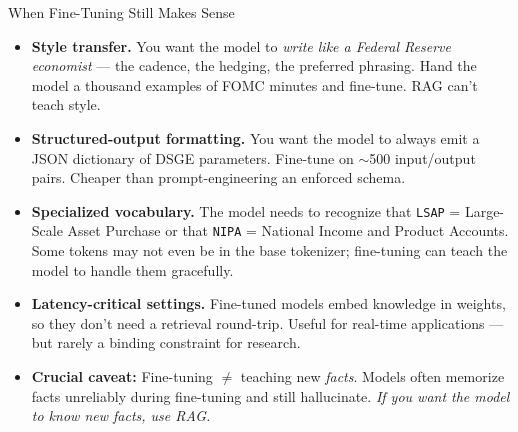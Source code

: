 \begin{frame}{When Fine-Tuning Still Makes Sense}
\begin{itemize}
\item \textbf{Style transfer.} You want the model to \emph{write like a Federal Reserve economist} --- the cadence, the hedging, the preferred phrasing. Hand the model a thousand examples of FOMC minutes and fine-tune. RAG can't teach style.

\medskip
\item \textbf{Structured-output formatting.} You want the model to always emit a JSON dictionary of DSGE parameters. Fine-tune on $\sim$500 input/output pairs. Cheaper than prompt-engineering an enforced schema.

\medskip
\item \textbf{Specialized vocabulary.} The model needs to recognize that \texttt{LSAP} = Large-Scale Asset Purchase or that \texttt{NIPA} = National Income and Product Accounts. Some tokens may not even be in the base tokenizer; fine-tuning can teach the model to handle them gracefully.

\medskip
\item \textbf{Latency-critical settings.} Fine-tuned models embed knowledge in weights, so they don't need a retrieval round-trip. Useful for real-time applications --- but rarely a binding constraint for research.

\medskip
\item \textbf{Crucial caveat:} Fine-tuning $\neq$ teaching new \emph{facts}. Models often memorize facts unreliably during fine-tuning and still hallucinate. \emph{If you want the model to know new facts, use RAG.}
\end{itemize}
\end{frame}

